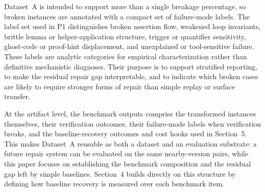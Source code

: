 Dataset~A is intended to support more than a single breakage percentage, so broken instances are annotated with a compact set of failure-mode labels. The label set used in P1 distinguishes broken assertion flow, weakened loop invariants, brittle lemma or helper-application structure, trigger or quantifier sensitivity, ghost-code or proof-hint displacement, and unexplained or tool-sensitive failure. These labels are analytic categories for empirical characterization rather than definitive mechanistic diagnoses. Their purpose is to support stratified reporting, to make the residual repair gap interpretable, and to indicate which broken cases are likely to require stronger forms of repair than simple replay or surface transfer.

At the artifact level, the benchmark outputs comprise the transformed instances themselves, their verification outcomes, their failure-mode labels when verification breaks, and the baseline-recovery outcomes and cost hooks used in Section~5. This makes Dataset~A reusable as both a dataset and an evaluation substrate: a future repair system can be evaluated on the same nearby-version pairs, while this paper focuses on establishing the benchmark composition and the residual gap left by simple baselines. Section~4 builds directly on this structure by defining how baseline recovery is measured over each benchmark item.
